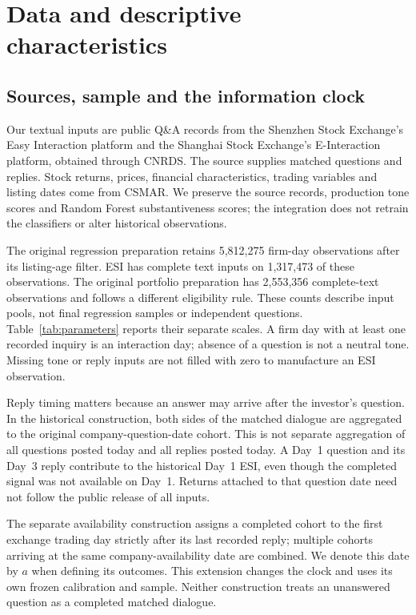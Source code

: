 \section{Data and descriptive characteristics}\label{sec:data}
\subsection{Sources, sample and the information clock}
Our textual inputs are public Q\&A records from the Shenzhen Stock Exchange's Easy Interaction platform and the Shanghai Stock Exchange's E-Interaction platform, obtained through CNRDS. The source supplies matched questions and replies. Stock returns, prices, financial characteristics, trading variables and listing dates come from CSMAR. We preserve the source records, production tone scores and Random Forest substantiveness scores; the integration does not retrain the classifiers or alter historical observations.

The original regression preparation retains 5,812,275 firm-day observations after its listing-age filter. ESI has complete text inputs on 1,317,473 of these observations. The original portfolio preparation has 2,553,356 complete-text observations and follows a different eligibility rule. These counts describe input pools, not final regression samples or independent questions. Table~\ref{tab:parameters} reports their separate scales. A firm day with at least one recorded inquiry is an interaction day; absence of a question is not a neutral tone. Missing tone or reply inputs are not filled with zero to manufacture an ESI observation.

Reply timing matters because an answer may arrive after the investor's question. In the historical construction, both sides of the matched dialogue are aggregated to the original company-question-date cohort. This is not separate aggregation of all questions posted today and all replies posted today. A Day~1 question and its Day~3 reply contribute to the historical Day~1 ESI, even though the completed signal was not available on Day~1. Returns attached to that question date need not follow the public release of all inputs.

The separate availability construction assigns a completed cohort to the first exchange trading day strictly after its last recorded reply; multiple cohorts arriving at the same company-availability date are combined. We denote this date by $a$ when defining its outcomes. This extension changes the clock and uses its own frozen calibration and sample. Neither construction treats an unanswered question as a completed matched dialogue.


